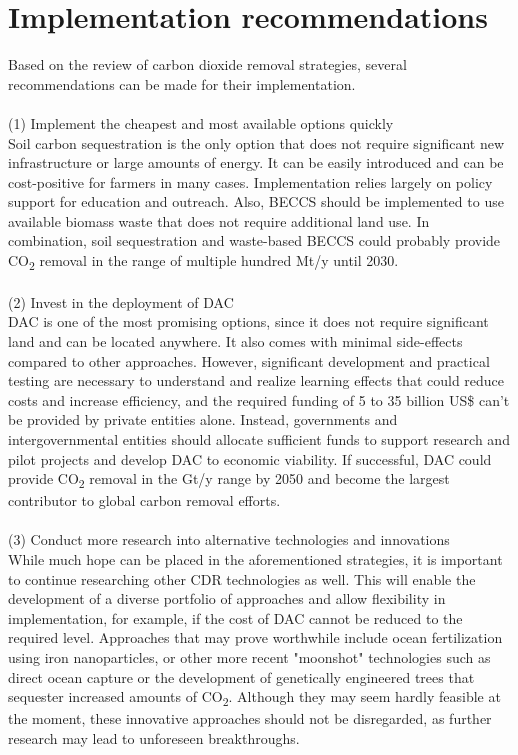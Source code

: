 \newpage
\section{Implementation recommendations}
Based on the review of carbon dioxide removal strategies, several recommendations can be made for their implementation.\\
\\(1) Implement the cheapest and most available options quickly\\
Soil carbon sequestration is the only option that does not require significant new infrastructure or large amounts of energy. It can be easily introduced and can be cost-positive for farmers in many cases. Implementation relies largely on policy support for education and outreach. Also, BECCS should be implemented to use available biomass waste that does not require additional land use. In combination, soil sequestration and waste-based BECCS could probably provide CO\textsubscript{2} removal in the range of multiple hundred Mt/y until 2030.\\
\\(2) Invest in the deployment of DAC\\
DAC is one of the most promising options, since it does not require significant land and can be located anywhere. It also comes with minimal side-effects compared to other approaches. However, significant development and practical testing are necessary to understand and realize learning effects that could reduce costs and increase efficiency, and the required funding of 5 to 35 billion US\$ can't be provided by private entities alone. Instead, governments and intergovernmental entities should allocate sufficient funds to support research and pilot projects and develop DAC to economic viability. If successful, DAC could provide CO\textsubscript{2} removal in the Gt/y range by 2050 and become the largest contributor to global carbon removal efforts.\\
\\(3) Conduct more research into alternative technologies and innovations\\
While much hope can be placed in the aforementioned strategies, it is important to continue researching other CDR technologies as well. This will enable the development of a diverse portfolio of approaches and allow flexibility in implementation, for example, if the cost of DAC cannot be reduced to the required level. Approaches that may prove worthwhile include ocean fertilization using iron nanoparticles, or other more recent "moonshot" technologies such as direct ocean capture or the development of genetically engineered trees that sequester increased amounts of CO\textsubscript{2}. Although they may seem hardly feasible at the moment, these innovative approaches should not be disregarded, as further research may lead to unforeseen breakthroughs.